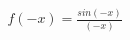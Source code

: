 \documentclass[preview]{standalone}
\begin{document}
\begin{align*}
f(-x)= \frac{sin(-x)}{(-x)}
\end{align*}
\end{document}
